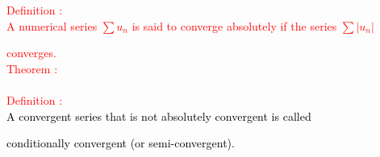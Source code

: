 \documentclass[a4paper,12pt]{article}
\begin{document}
\textcolor{red}{Definition :}\\

\textcolor{red}{A numerical series $\sum{u_n}$ is said to converge absolutely if the series $\sum{|u_n|}$} 

\textcolor{red}{ converges.} \\

\textcolor{red}{Theorem :} \\

 \\

\textcolor{red}{Definition :} \\

\textcolor{black}{A convergent series that is not absolutely convergent is called }

\textcolor{black}{conditionally convergent (or semi-convergent).}
\end{document}

